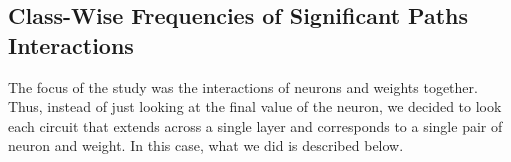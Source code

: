 \documentclass{article}
\begin{document}
                
        
        
        \subsection{Class-Wise Frequencies of Significant Paths Interactions}
            The focus of the study was the interactions of neurons and weights together. Thus, instead of just looking at the final value of the neuron, we decided to look each circuit that extends across a single layer and corresponds to a single pair of neuron and weight. In this case, what we did is described below. 
\end{document}
